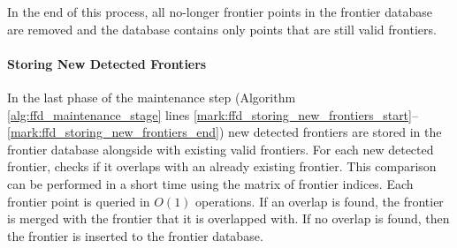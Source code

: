 	In the end of this process, all no-longer frontier points in the frontier
	database are removed and the database contains only points that are still valid
	frontiers. 
	
	\paragraph{Storing New Detected Frontiers}
	\label{section:storing_frontiers}	
	In the last phase of the maintenance step (Algorithm
	\ref{alg:ffd_maintenance_stage} lines
	\ref{mark:ffd_storing_new_frontiers_start}--\ref{mark:ffd_storing_new_frontiers_end})
	new detected frontiers are stored in the frontier database alongside with
	existing valid frontiers.  For each new detected frontier, \FFD checks if it
	overlaps with an already existing frontier. This comparison can be performed
	in a short time using the matrix of frontier indices. Each frontier point is
	queried in $O(1)$ operations. If an overlap is found, the frontier is merged
	with the frontier that it is overlapped with. If no overlap is found, then the
	frontier is inserted to the frontier database.
	
	
	

%  



